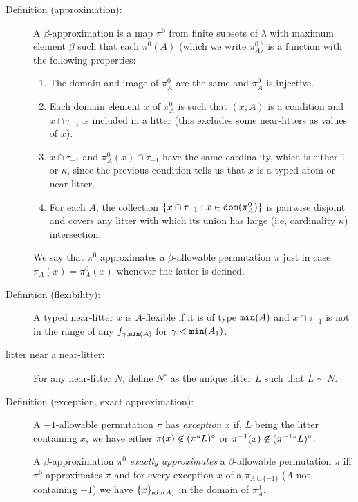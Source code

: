 \documentclass[112pt]{article}
\begin{document}
\begin{description}
\item[Definition (approximation):]   A $\beta$-approximation is a map $\pi^0$ from finite subsets of $\lambda$ with maximum element $\beta$ such
that each $\pi^0(A)$ (which we write $\pi^0_A$) is a function with the following properties:

\begin{enumerate}

\item  The domain and image of $\pi^0_A$ are the same and $\pi^0_A$ is injective.

\item Each domain element $x$ of $\pi^0_A$ is such that $(x,A)$ is a condition and $x \cap \tau_{-1}$ is included in a litter (this excludes some near-litters as values of $x$).

\item $x \cap \tau_{-1}$ and $\pi^0_A(x) \cap \tau_{-1}$ have the same cardinality, which is either 1 or $\kappa$, since the previous condition tells us that $x$ is a typed atom or near-litter.

\item  For each $A$, the collection $\{x \cap \tau_{-1}: x \in {\tt dom}(\pi^0_A)\}$ is pairwise disjoint  and covers any litter with which its union has large (i.e, cardinality $\kappa$)  intersection.

\end{enumerate}

We say that $\pi^0$ approximates a $\beta$-allowable permutation $\pi$ just in case $\pi_A(x) = \pi^0_A(x)$ whenever the latter is defined.

\item[Definition (flexibility):]  A typed near-litter $x$ is $A$-flexible if it is of type ${\tt min}(A)$ and $x \cap \tau_{-1}$ is not in the range of any $f_{\gamma,{\tt min}(A)}$
for $\gamma<{\tt min}(A_1)$.

\item[litter near a near-litter:]  For any near-litter $N$, define $N^\circ$ as the unique litter $L$ such that $L \sim N$.

\item[Definition (exception, exact approximation):]  A $-1$-allowable permutation $\pi$ has {\em exception\/} $x$ if, $L$ being the litter containing $x$,
we have either $\pi(x) \not\in (\pi``L)^\circ$ or $\pi^{-1}(x) \not\in (\pi^{-1}``L)^\circ$.

A $\beta$-approximation $\pi^0$ {\em exactly approximates\/} a $\beta$-allowable permutation $\pi$ iff $\pi^0$ approximates $\pi$ and
for every exception $x$ of a $\pi_{A \cup \{-1\}}$ ($A$ not containing $-1$) we have $\{x\}_{{\tt min}(A)}$ in the domain of $\pi^0_A$.


\end{description}
\end{document}
